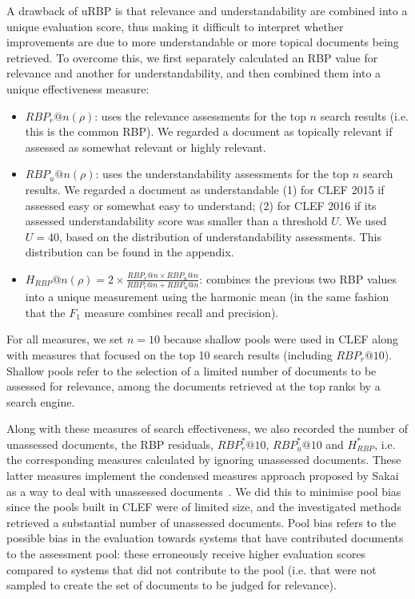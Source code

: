 \documentclass[10pt,a4paper]{article}
\begin{document}
A drawback of uRBP is that relevance and understandability are combined into a unique evaluation score, thus making it difficult to interpret whether improvements are due to more understandable or more topical documents being retrieved. To overcome this, we first separately calculated an RBP value for relevance and another for understandability, and then combined them into a unique effectiveness measure:

\begin{itemize}[leftmargin=*]
	\item $RBP_r@n(\rho)$: uses the relevance assessments for the top $n$ search results (i.e. this is the common RBP). We regarded a document as topically relevant if assessed as somewhat relevant or highly relevant.
	
	\item $RBP_u@n(\rho)$: uses the understandability assessments for the top $n$ search results. We regarded a document as understandable (1) for CLEF 2015 if assessed easy or somewhat easy to understand; (2) for CLEF 2016 if its assessed understandability score was smaller than a threshold $U$. We used $U = 40$, based on the distribution of understandability assessments. This distribution can be found in the appendix.
	
	\item $H_{RBP}@n(\rho) = 2 \times \frac{RBP_r@n \times RBP_u@n}{RBP_r@n + RBP_u@n}$: combines the previous two RBP values into a unique measurement using the harmonic mean (in the same fashion that the $F_1$ measure combines recall and precision).
\end{itemize}

\noindent For all measures, we set $n=10$ because shallow pools were used in CLEF along with measures that focused on the top 10 search results (including $RBP_r@10$). Shallow pools refer to the selection of a limited number of documents to be assessed for relevance, among the documents retrieved at the top ranks by a search engine.

Along with these measures of search effectiveness, we also recorded the number of unassessed documents, the RBP residuals,  $RBP^*_r@10$, $RBP^*_u@10$ and $H_{RBP}^*$, i.e. the corresponding measures calculated by ignoring unassessed documents. These latter measures implement the condensed measures approach proposed by Sakai as a way to deal with unassessed documents~\cite{sakai2007alternatives}. We did this to minimise pool bias since the pools built in CLEF were of limited size, and the investigated methods retrieved a substantial number of unassessed documents. Pool bias refers to the possible bias in the evaluation towards systems that have contributed documents to the assessment pool: these erroneously receive higher evaluation scores compared to systems that did not contribute to the pool (i.e. that were not sampled to create the set of documents to be judged for relevance). 
\end{document}

